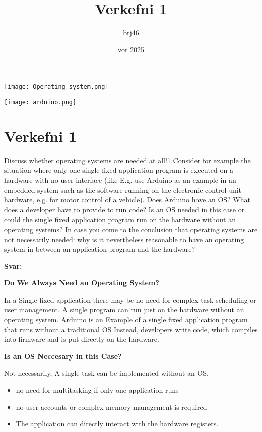 \documentclass{article}
\title{Verkefni 1}
\author{brj46 }
\date{vor 2025}
\newcommand{\sv}{\textbf{Svar:}}
\newcommand{\bo}[1]{\textbf{#1}}
\begin{document}
\maketitle



\vspace{5em}

\begin{center}
    \texttt{[image: Operating-system.png]}
\end{center}

\vspace{3em}

\begin{center}
    \texttt{[image: arduino.png]}
\end{center}

\newpage

\section{Verkefni 1}

Discuss whether operating systems are needed at all!1 Consider for example the situation
where only one single fixed application program is executed on a hardware with no user
interface (like E.g. use Arduino as an example in an embedded system such as the software
running on the electronic control unit hardware, e.g. for motor control of a vehicle). Does
Arduino have an OS? What does a developer have to provide to run code? Is an OS needed
in this case or could the single fixed application program run on the hardware without an
operating systems?
In case you come to the conclusion that operating systems are not necessarily needed: why
is it nevertheless reasonable to have an operating system in-between an application program
and the hardware?

\sv

\bo{Do We Always Need an Operating System?}

In a Single fixed application there may be no need for complex task scheduling or user management.
A single program can run just on the hardware without an operating system.
Arduino is an Example of a single fixed application program that runs without a traditional OS
Instead, developers write code, which compiles into firmware and is put directly on the hardware.

\bo{Is an OS Neccesary in this Case?}

Not necessarily, A single task can be implemented without an OS.
\begin{itemize}
  \item no need for multitasking if only one application runs
  \item no user accounts or complex memory management is required
  \item The application can directly interact with the hardware registers.
\end{itemize}
\end{document}
